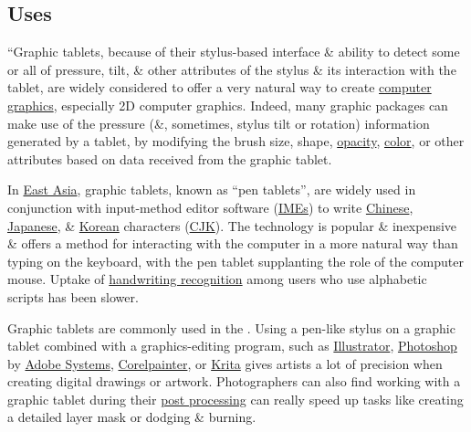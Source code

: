 \documentclass[oneside]{book}
\numberwithin{equation}{section}
\begin{document}
\subsection{Uses}
``Graphic tablets, because of their stylus-based interface \& ability to detect some or all of pressure, tilt, \& other attributes of the stylus \& its interaction with the tablet, are widely considered to offer a very natural way to create \href{https://en.wikipedia.org/wiki/Computer_graphics}{computer graphics}, especially 2D computer graphics. Indeed, many graphic packages can make use of the pressure (\&, sometimes, stylus tilt or rotation) information generated by a tablet, by modifying the brush size, shape, \href{https://en.wikipedia.org/wiki/Opacity_(optics)}{opacity}, \href{https://en.wikipedia.org/wiki/Color}{color}, or other attributes based on data received from the graphic tablet.

In \href{https://en.wikipedia.org/wiki/East_Asia}{East Asia}, graphic tablets, known as ``pen tablets'', are widely used in conjunction with input-method editor software (\href{https://en.wikipedia.org/wiki/Input_Method_Editor}{IMEs}) to write \href{https://en.wikipedia.org/wiki/Chinese_language}{Chinese}, \href{https://en.wikipedia.org/wiki/Japanese_language}{Japanese}, \& \href{https://en.wikipedia.org/wiki/Korean_language}{Korean} characters (\href{https://en.wikipedia.org/wiki/CJK}{CJK}). The technology is popular \& inexpensive \& offers a method for interacting with the computer in a more natural way than typing on the keyboard, with the pen tablet supplanting the role of the computer mouse. Uptake of \href{https://en.wikipedia.org/wiki/Handwriting_recognition}{handwriting recognition} among users who use alphabetic scripts has been slower.

Graphic tablets are commonly used in the . Using a pen-like stylus on a graphic tablet combined with a graphics-editing program, such as \href{https://en.wikipedia.org/wiki/Adobe_Illustrator}{Illustrator}, \href{https://en.wikipedia.org/wiki/Adobe_Photoshop}{Photoshop} by \href{https://en.wikipedia.org/wiki/Adobe_Systems}{Adobe Systems}, \href{https://en.wikipedia.org/wiki/Corel_Painter}{Corelpainter}, or \href{https://en.wikipedia.org/wiki/Krita}{Krita} gives artists a lot of precision when creating digital drawings or artwork. Photographers can also find working with a graphic tablet during their \href{https://en.wikipedia.org/wiki/Image_editing}{post processing} can really speed up tasks like creating a detailed layer mask or dodging \& burning.
\end{document}
